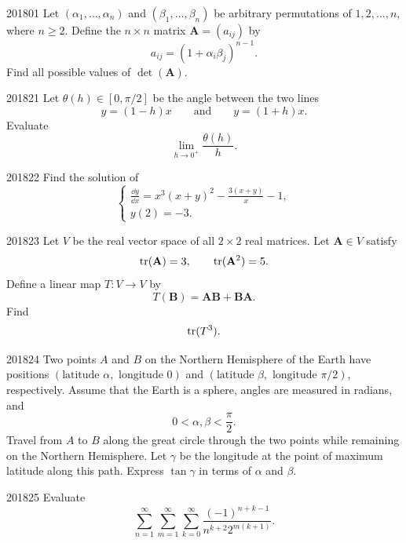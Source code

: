 
\begin{problem}{2018}{0}{1}
Let $(\alpha_1, \dots, \alpha_n)$ and $(\beta_1, \dots, \beta_n)$ be arbitrary permutations of $1, 2, \dots, n$, where $n\ge2$. Define the $n\times n$ matrix $\mathbf A=(a_{ij})$ by
\[
    a_{ij}=(1+\alpha_i\beta_j)^{n-1}.
\]
Find all possible values of $\det(\mathbf A)$.
\end{problem}

\begin{problem}{2018}{2}{1}
Let $\theta(h)\in[0, \pi/2]$ be the angle between the two lines
\[
    y=(1-h)x
    \qquad\text{and}\qquad
    y=(1+h)x.
\]
Evaluate
\[
    \lim_{h\to0^+}\frac{\theta(h)}{h}.
\]
\end{problem}

\begin{problem}{2018}{2}{2}
Find the solution of
\[
\begin{cases}
    \displaystyle\frac{\dd y}{\dd x}
    =x^3(x+y)^2-\frac{3(x+y)}{x}-1, \\[0.4em]
    y(2)=-3.
\end{cases}
\]
\end{problem}

\begin{problem}{2018}{2}{3}
Let $V$ be the real vector space of all $2\times2$ real matrices. Let $\mathbf A\in V$ satisfy
\[
    \operatorname{tr}(\mathbf A)=3,
    \qquad
    \operatorname{tr}(\mathbf A^2)=5.
\]
Define a linear map $T\colon V\to V$ by
\[
    T(\mathbf B)=\mathbf A\mathbf B+\mathbf B\mathbf A.
\]
Find
\[
    \operatorname{tr}(T^3).
\]
\end{problem}

\begin{problem}{2018}{2}{4}
Two points $A$ and $B$ on the Northern Hemisphere of the Earth have positions $(\text{latitude }\alpha, \text{ longitude }0)$ and $(\text{latitude }\beta, \text{ longitude }\pi/2)$, respectively. Assume that the Earth is a sphere, angles are measured in radians, and
\[
    0<\alpha, \beta<\frac{\pi}{2}.
\]
Travel from $A$ to $B$ along the great circle through the two points while remaining on the Northern Hemisphere. Let $\gamma$ be the longitude at the point of maximum latitude along this path. Express $\tan\gamma$ in terms of $\alpha$ and $\beta$.
\end{problem}

\begin{problem}{2018}{2}{5}
Evaluate
\[
    \sum_{n=1}^{\infty}
    \sum_{m=1}^{\infty}
    \sum_{k=0}^{\infty}
    \frac{(-1)^{n+k-1}}{n^{k+2}2^{m(k+1)}}.
\]
\end{problem}

